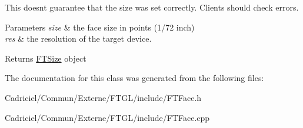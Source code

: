This doesn\textquotesingle{}t guarantee that the size was set correctly. Clients should check errors.


\begin{DoxyParams}{Parameters}
{\em size} & the face size in points (1/72 inch) \\
\hline
{\em res} & the resolution of the target device. \\
\hline
\end{DoxyParams}
\begin{DoxyReturn}{Returns}
{\ttfamily \hyperlink{class_f_t_size}{F\+T\+Size}} object 
\end{DoxyReturn}


The documentation for this class was generated from the following files\+:\begin{DoxyCompactItemize}
\item 
Cadriciel/\+Commun/\+Externe/\+F\+T\+G\+L/include/F\+T\+Face.\+h\item 
Cadriciel/\+Commun/\+Externe/\+F\+T\+G\+L/include/F\+T\+Face.\+cpp\end{DoxyCompactItemize}

